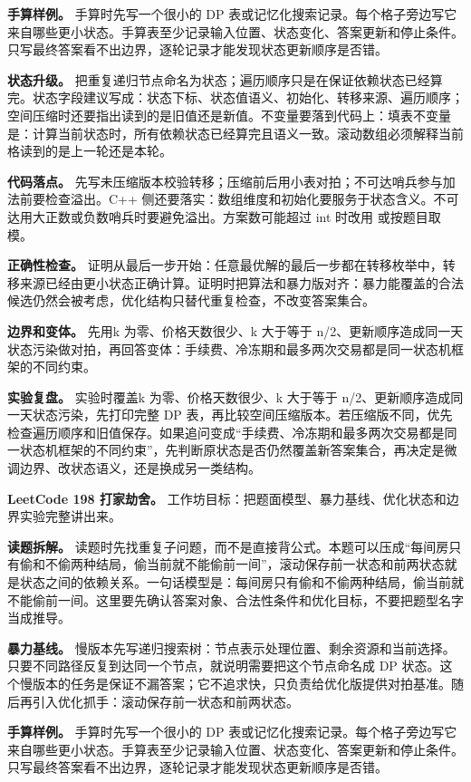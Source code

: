 \textbf{手算样例。} 手算时先写一个很小的 DP 表或记忆化搜索记录。每个格子旁边写它来自哪些更小状态。手算表至少记录输入位置、状态变化、答案更新和停止条件。只写最终答案看不出边界，逐轮记录才能发现状态更新顺序是否错。

\textbf{状态升级。} 把重复递归节点命名为状态；遍历顺序只是在保证依赖状态已经算完。状态字段建议写成：状态下标、状态值语义、初始化、转移来源、遍历顺序；空间压缩时还要指出读到的是旧值还是新值。不变量要落到代码上：填表不变量是：计算当前状态时，所有依赖状态已经算完且语义一致。滚动数组必须解释当前格读到的是上一轮还是本轮。

\textbf{代码落点。} 先写未压缩版本校验转移；压缩前后用小表对拍；不可达哨兵参与加法前要检查溢出。C++ 侧还要落实：数组维度和初始化要服务于状态含义。不可达用大正数或负数哨兵时要避免溢出。方案数可能超过 int 时改用  或按题目取模。

\textbf{正确性检查。} 证明从最后一步开始：任意最优解的最后一步都在转移枚举中，转移来源已经由更小状态正确计算。证明时把算法和暴力版对齐：暴力能覆盖的合法候选仍然会被考虑，优化结构只替代重复检查，不改变答案集合。

\textbf{边界和变体。} 先用k 为零、价格天数很少、k 大于等于 n/2、更新顺序造成同一天状态污染做对拍，再回答变体：手续费、冷冻期和最多两次交易都是同一状态机框架的不同约束。

\textbf{实验复盘。} 实验时覆盖k 为零、价格天数很少、k 大于等于 n/2、更新顺序造成同一天状态污染，先打印完整 DP 表，再比较空间压缩版本。若压缩版不同，优先检查遍历顺序和旧值保存。如果追问变成“手续费、冷冻期和最多两次交易都是同一状态机框架的不同约束”，先判断原状态是否仍然覆盖新答案集合，再决定是微调边界、改状态语义，还是换成另一类结构。

\noindent\textbf{LeetCode 198 打家劫舍。} 工作坊目标：把题面模型、暴力基线、优化状态和边界实验完整讲出来。

\textbf{读题拆解。} 读题时先找重复子问题，而不是直接背公式。本题可以压成“每间房只有偷和不偷两种结局，偷当前就不能偷前一间”，滚动保存前一状态和前两状态就是状态之间的依赖关系。一句话模型是：每间房只有偷和不偷两种结局，偷当前就不能偷前一间。这里要先确认答案对象、合法性条件和优化目标，不要把题型名字当成推导。

\textbf{暴力基线。} 慢版本先写递归搜索树：节点表示处理位置、剩余资源和当前选择。只要不同路径反复到达同一个节点，就说明需要把这个节点命名成 DP 状态。这个慢版本的任务是保证不漏答案；它不追求快，只负责给优化版提供对拍基准。随后再引入优化抓手：滚动保存前一状态和前两状态。

\textbf{手算样例。} 手算时先写一个很小的 DP 表或记忆化搜索记录。每个格子旁边写它来自哪些更小状态。手算表至少记录输入位置、状态变化、答案更新和停止条件。只写最终答案看不出边界，逐轮记录才能发现状态更新顺序是否错。

